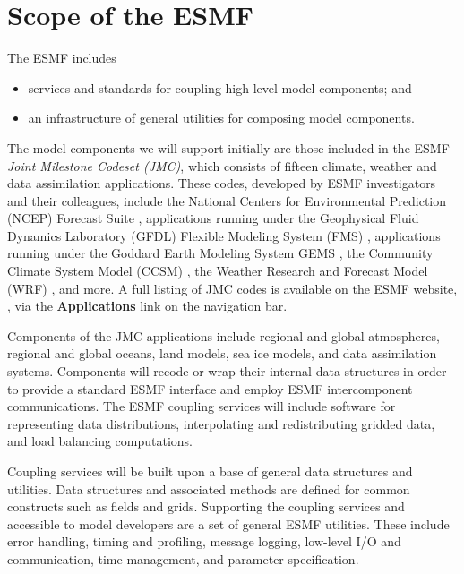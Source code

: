 \section{Scope of the ESMF}
\label{sec:shortscope}

The ESMF includes
\begin{itemize}
\item services and standards for coupling high-level model components; and 
\item an infrastructure of general utilities for composing model components.
\end{itemize}  
The model components we will support initially are those included in the ESMF {\it Joint 
Milestone Codeset (JMC)}, which consists of fifteen climate, weather and data 
assimilation applications.
These codes, developed by ESMF investigators and their colleagues, include the National 
Centers for Environmental Prediction (NCEP) Forecast 
Suite \cite{parrish, derber1}, applications running under the Geophysical Fluid Dynamics
Laboratory (GFDL) Flexible Modeling System (FMS) \cite{fms}, applications running under 
the Goddard Earth Modeling System {GEMS} \cite{gems}, the Community Climate System 
Model (CCSM) \cite{ccsm}, the Weather Research and Forecast Model (WRF) \cite{wrf}, and 
more.  A full listing of JMC codes is available on the ESMF website, 
,
via the {\bf Applications} link on the navigation bar.  

Components of the JMC applications include regional and global atmospheres, regional and 
global oceans, land models, sea ice models, and data assimilation systems.  Components will 
recode or wrap their internal data structures in order to provide a standard ESMF interface 
and employ ESMF intercomponent communications.  The ESMF coupling services will include 
software for representing data distributions, interpolating and redistributing gridded data, 
and load balancing computations.

Coupling services will be built upon a base of general data structures and utilities.
Data structures and associated methods are defined for common constructs such as 
fields and grids.  
Supporting the coupling services and accessible to model developers are a set of 
general ESMF utilities.  These include error handling, timing and profiling, 
message logging, low-level I/O and communication, time management, and parameter 
specification.


